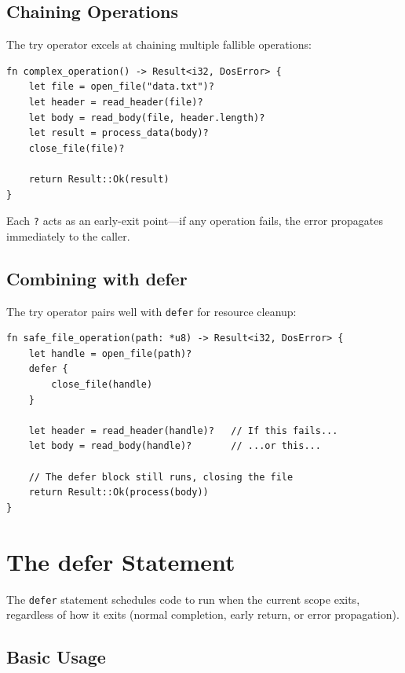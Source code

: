 \subsection{Chaining Operations}
\label{subsec:try-chaining}

The try operator excels at chaining multiple fallible operations:

\begin{lstlisting}
fn complex_operation() -> Result<i32, DosError> {
    let file = open_file("data.txt")?
    let header = read_header(file)?
    let body = read_body(file, header.length)?
    let result = process_data(body)?
    close_file(file)?

    return Result::Ok(result)
}
\end{lstlisting}

Each \texttt{?} acts as an early-exit point---if any operation fails, the error propagates immediately to the caller.

\subsection{Combining with defer}
\label{subsec:try-defer}

The try operator pairs well with \texttt{defer} for resource cleanup:

\begin{lstlisting}
fn safe_file_operation(path: *u8) -> Result<i32, DosError> {
    let handle = open_file(path)?
    defer {
        close_file(handle)
    }

    let header = read_header(handle)?   // If this fails...
    let body = read_body(handle)?       // ...or this...

    // The defer block still runs, closing the file
    return Result::Ok(process(body))
}
\end{lstlisting}

\section{The defer Statement}
\label{sec:defer}

The \texttt{defer} statement schedules code to run when the current scope exits, regardless of how it exits (normal completion, early return, or error propagation).

\subsection{Basic Usage}
\label{subsec:defer-basic}

